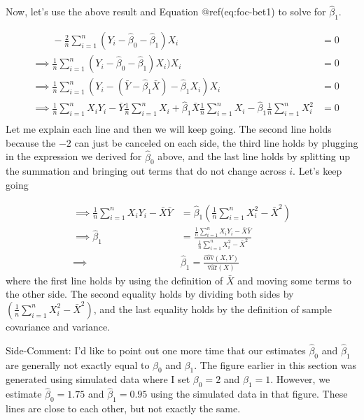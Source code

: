 \documentclass[
  letterpaper,
  DIV=11,
  numbers=noendperiod]{scrreprt}
\begin{document}
Now, let's use the above result and Equation @ref(eq:foc-bet1) to solve
for \(\hat{\beta}_1\).

\[
  \begin{aligned}
  & \phantom{\implies} -\frac{2}{n} \sum_{i=1}^n (Y_i - \hat{\beta}_0 - \hat{\beta}_1) X_i &= 0 \\
  & \implies  \frac{1}{n} \sum_{i=1}^n (Y_i - \hat{\beta}_0 - \hat{\beta}_1) X_i) X_i &= 0 \\
  & \implies  \frac{1}{n} \sum_{i=1}^n (Y_i - (\bar{Y} - \hat{\beta}_1 \bar{X}) - \hat{\beta}_1 X_i) X_i &= 0 \\
  & \implies  \frac{1}{n} \sum_{i=1}^n X_i Y_i - \bar{Y} \frac{1}{n} \sum_{i=1}^n X_i + \hat{\beta}_1 \bar{X} \frac{1}{n} \sum_{i=1}^n X_i - \hat{\beta}_1 \frac{1}{n} \sum_{i=1}^n X_i^2 &= 0  \\
\end{aligned}
\] Let me explain each line and then we will keep going. The second line
holds because the \(-2\) can just be canceled on each side, the third
line holds by plugging in the expression we derived for
\(\hat{\beta}_0\) above, and the last line holds by splitting up the
summation and bringing out terms that do not change across \(i\). Let's
keep going

\[
\begin{aligned}
  \implies  \frac{1}{n} \sum_{i=1}^n X_i Y_i - \bar{X}\bar{Y} &= \hat{\beta}_1\left(\frac{1}{n} \sum_{i=1}^n X_i^2 - \bar{X}^2 \right) \\
  \implies  \hat{\beta}_1 &= \frac{\frac{1}{n} \sum_{i=1}^n X_i Y_i - \bar{X}\bar{Y}}{\frac{1}{n} \sum_{i=1}^n X_i^2 - \bar{X}^2} \\
  \implies  & \boxed{\hat{\beta}_1 = \frac{\widehat{\mathrm{cov}}(X,Y)}{\widehat{\mathrm{var}}(X)}}
  \end{aligned}
\] where the first line holds by using the definition of \(\bar{X}\) and
moving some terms to the other side. The second equality holds by
dividing both sides by
\(\left(\frac{1}{n} \displaystyle \sum_{i=1}^n X_i^2 - \bar{X}^2 \right)\),
and the last equality holds by the definition of sample covariance and
variance.

{Side-Comment:} I'd like to point out one more time that our estimates
\(\hat{\beta}_0\) and \(\hat{\beta}_1\) are generally not exactly equal
to \(\beta_0\) and \(\beta_1\). The figure earlier in this section was
generated using simulated data where I set \(\beta_0=2\) and
\(\beta_1=1\). However, we estimate \(\hat{\beta}_0 = 1.75\) and
\(\hat{\beta}_1 = 0.95\) using the simulated data in that figure. These
lines are close to each other, but not exactly the same.
\end{document}
